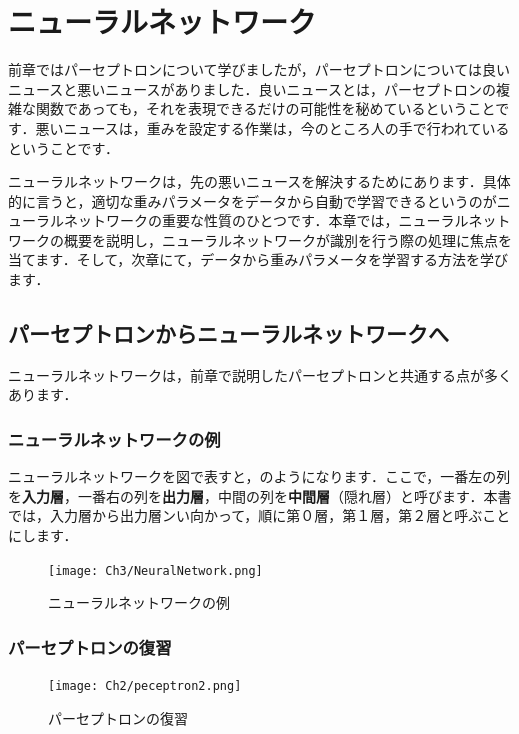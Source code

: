 \section{ニューラルネットワーク}
前章ではパーセプトロンについて学びましたが，パーセプトロンについては良いニュースと悪いニュースがありました．良いニュースとは，パーセプトロンの複雑な関数であっても，それを表現できるだけの可能性を秘めているということです．悪いニュースは，重みを設定する作業は，今のところ人の手で行われているということです．

ニューラルネットワークは，先の悪いニュースを解決するためにあります．具体的に言うと，適切な重みパラメータをデータから自動で学習できるというのがニューラルネットワークの重要な性質のひとつです．本章では，ニューラルネットワークの概要を説明し，ニューラルネットワークが識別を行う際の処理に焦点を当てます．そして，次章にて，データから重みパラメータを学習する方法を学びます．
\subsection{パーセプトロンからニューラルネットワークへ}
ニューラルネットワークは，前章で説明したパーセプトロンと共通する点が多くあります．
\subsubsection{ニューラルネットワークの例}
ニューラルネットワークを図で表すと，のようになります．ここで，一番左の列を\textbf{入力層}，一番右の列を\textbf{出力層}，中間の列を\textbf{中間層}（隠れ層）と呼びます．本書では，入力層から出力層ンい向かって，順に第０層，第１層，第２層と呼ぶことにします．

\begin{figure}[h]
  \vspace{0mm}
  \begin{center}
    \hspace{0mm}
    \centering
    \texttt{[image: Ch3/NeuralNetwork.png]} \
    \vspace{0mm}
    \caption{ニューラルネットワークの例}
    \label{fig:3_NeuralNetwork}
  \end{center}
\end{figure}

\subsubsection{パーセプトロンの復習}

\begin{figure}[h]
  \vspace{0mm}
  \begin{center}
    \hspace{0mm}
    \centering
    \texttt{[image: Ch2/peceptron2.png]} \
    \vspace{0mm}
    \caption{パーセプトロンの復習}
    \label{fig:3_peceptron2}
  \end{center}
\end{figure}

